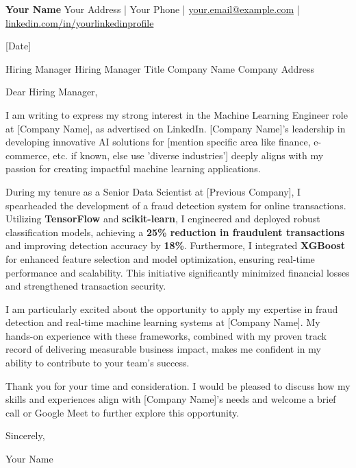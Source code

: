 \documentclass[11pt, letterpaper]{article}
\newcommand{\name}[1]{\Large{\textbf{#1}} \vspace{-2pt}}
\newcommand{\address}[1]{\small{#1}}
\newcommand{\contact}[1]{\href{#1}{#1}}
\begin{document}
\name{Your Name}
\address{Your Address | Your Phone | \contact{your.email@example.com} | \href{https://yourlinkedin.com}{linkedin.com/in/yourlinkedinprofile}}

\vspace{10pt}

[Date]

\vspace{10pt}

Hiring Manager
Hiring Manager Title
Company Name
Company Address

\vspace{20pt}

Dear Hiring Manager,

\vspace{10pt}

I am writing to express my strong interest in the Machine Learning Engineer role at [Company Name], as advertised on LinkedIn. [Company Name]'s leadership in developing innovative AI solutions for [mention specific area like finance, e-commerce, etc. if known, else use 'diverse industries'] deeply aligns with my passion for creating impactful machine learning applications.

\vspace{10pt}

During my tenure as a Senior Data Scientist at [Previous Company], I spearheaded the development of a fraud detection system for online transactions.  Utilizing \textbf{TensorFlow} and \textbf{scikit-learn}, I engineered and deployed robust classification models, achieving a \textbf{25\% reduction in fraudulent transactions} and improving detection accuracy by \textbf{18\%}.  Furthermore, I integrated \textbf{XGBoost} for enhanced feature selection and model optimization, ensuring real-time performance and scalability. This initiative significantly minimized financial losses and strengthened transaction security.

\vspace{10pt}

I am particularly excited about the opportunity to apply my expertise in fraud detection and real-time machine learning systems at [Company Name].  My hands-on experience with these frameworks, combined with my proven track record of delivering measurable business impact, makes me confident in my ability to contribute to your team's success.

\vspace{10pt}

Thank you for your time and consideration. I would be pleased to discuss how my skills and experiences align with [Company Name]'s needs and welcome a brief call or Google Meet to further explore this opportunity.

\vspace{10pt}

Sincerely,

\vspace{2pt}

Your Name
\end{document}
